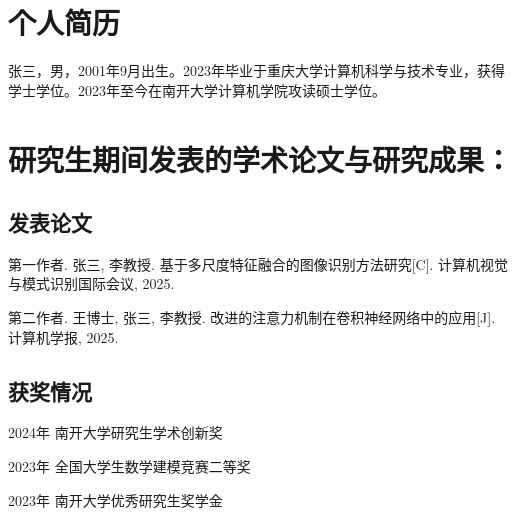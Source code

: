 
\begin{resume}

\section*{个人简历}

张三，男，2001年9月出生。2023年毕业于重庆大学计算机科学与技术专业，获得学士学位。2023年至今在南开大学计算机学院攻读硕士学位。

\section*{{研究生期间发表的学术论文与研究成果：}}


\subsection*{发表论文}

\begin{achivements}
    \item 第一作者. 张三, 李教授. 基于多尺度特征融合的图像识别方法研究[C]. 计算机视觉与模式识别国际会议, 2025.
    \item 第二作者. 王博士, 张三, 李教授. 改进的注意力机制在卷积神经网络中的应用[J]. 计算机学报, 2025.
\end{achivements}

\subsection*{获奖情况}

\begin{achivements}
    \item 2024年 南开大学研究生学术创新奖
    \item 2023年 全国大学生数学建模竞赛二等奖
    \item 2023年 南开大学优秀研究生奖学金
\end{achivements}

\end{resume}


